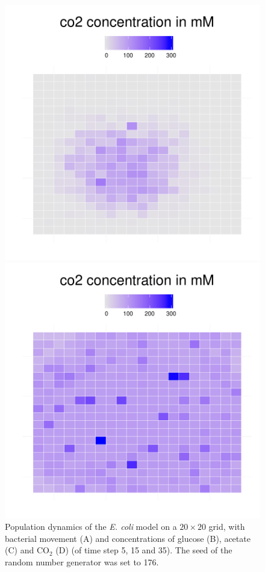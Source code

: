 \begin{figure}[h!]
{\begin{minipage}[t]{0.3\textwidth}
  \end{minipage}
  \begin{minipage}[t]{0.3\textwidth}
    \includegraphics[width=\textwidth]{../results/Bcoli_20x20_seed176_co215.pdf}
  \end{minipage}
  \begin{minipage}[t]{0.3\textwidth}
    \includegraphics[width=\textwidth]{../results/Bcoli_20x20_seed176_co235a.pdf}
  \end{minipage}
  }
  \caption{Population dynamics of the \emph{E. coli} model on a $20\times20$ grid, with bacterial movement (A) and concentrations of glucose (B), acetate (C) and CO$_2$ (D) (of time step 5, 15 and 35). The seed of the random number generator was set to 176.}
  \label{fig:ecoligrids}
\end{figure}

